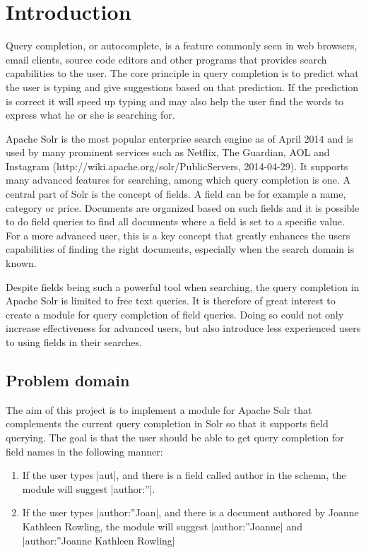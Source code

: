 \section{Introduction}\label{introduction}
Query completion, or autocomplete, is a feature commonly seen in web browsers, email clients, source code editors and other programs that provides search capabilities to the user. The core principle in query completion is to predict what the user is typing and give suggestions based on that prediction. If the prediction is correct it will speed up typing and may also help the user find the words to express what he or she is searching for. 

Apache Solr is the most popular enterprise search engine as of April 2014\cite{RANKINGS} and is used by many prominent services such as Netflix, The Guardian, AOL and Instagram (http://wiki.apache.org/solr/PublicServers, 2014-04-29). It supports many advanced features for searching, among which query completion is one. A central part of Solr is the concept of fields. A field can be for example a name, category or price. Documents are organized based on such fields and it is possible to do field queries to find all documents where a field is set to a specific value. For a more advanced user, this is a key concept that greatly enhances the users capabilities of finding the right documents, especially when the search domain is known. 

Despite fields being such a powerful tool when searching, the query completion in Apache Solr is limited to free text queries. It is therefore of great interest to create a module for query completion of field queries. Doing so could not only increase effectiveness for advanced users, but also introduce less experienced users to using fields in their searches.


\subsection{Problem domain}

The aim of this project is to implement a module for Apache Solr that complements the current query completion in Solr so that it supports field querying. The goal is that the user should be able to get query completion for field names in the following manner:
\begin{enumerate}
\item   If the user types |aut|, and there is a field called author in the schema, the module will suggest |author:”|. 
\item   If the user types |author:”Joan|, and there is a document authored by Joanne Kathleen Rowling, the module will suggest |author:”Joanne| and |author:”Joanne Kathleen Rowling|
\end{enumerate}

